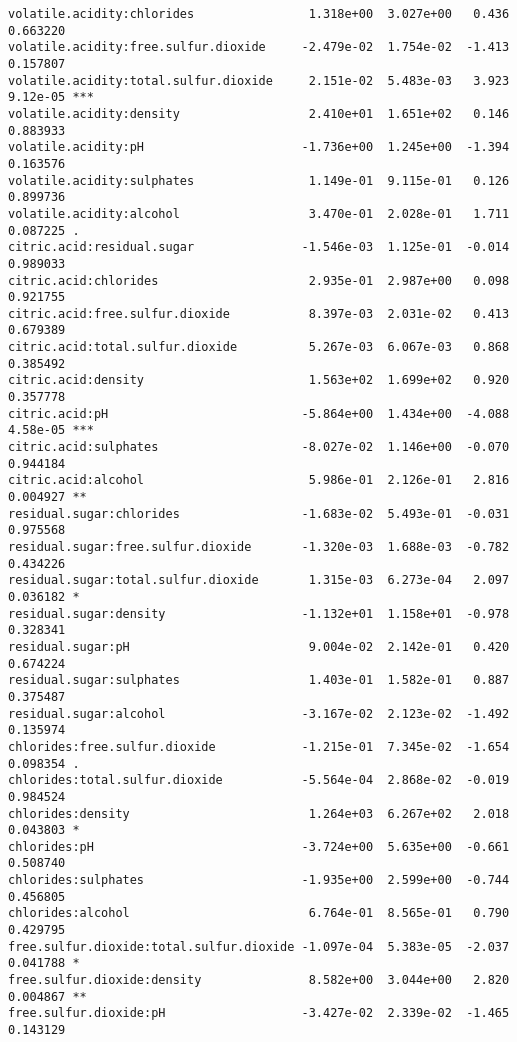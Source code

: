 \documentclass{jsarticle}
\begin{document}
\begin{verbatim}
volatile.acidity:chlorides                1.318e+00  3.027e+00   0.436 0.663220    
volatile.acidity:free.sulfur.dioxide     -2.479e-02  1.754e-02  -1.413 0.157807    
volatile.acidity:total.sulfur.dioxide     2.151e-02  5.483e-03   3.923 9.12e-05 ***
volatile.acidity:density                  2.410e+01  1.651e+02   0.146 0.883933    
volatile.acidity:pH                      -1.736e+00  1.245e+00  -1.394 0.163576    
volatile.acidity:sulphates                1.149e-01  9.115e-01   0.126 0.899736    
volatile.acidity:alcohol                  3.470e-01  2.028e-01   1.711 0.087225 .  
citric.acid:residual.sugar               -1.546e-03  1.125e-01  -0.014 0.989033    
citric.acid:chlorides                     2.935e-01  2.987e+00   0.098 0.921755    
citric.acid:free.sulfur.dioxide           8.397e-03  2.031e-02   0.413 0.679389    
citric.acid:total.sulfur.dioxide          5.267e-03  6.067e-03   0.868 0.385492    
citric.acid:density                       1.563e+02  1.699e+02   0.920 0.357778    
citric.acid:pH                           -5.864e+00  1.434e+00  -4.088 4.58e-05 ***
citric.acid:sulphates                    -8.027e-02  1.146e+00  -0.070 0.944184    
citric.acid:alcohol                       5.986e-01  2.126e-01   2.816 0.004927 ** 
residual.sugar:chlorides                 -1.683e-02  5.493e-01  -0.031 0.975568    
residual.sugar:free.sulfur.dioxide       -1.320e-03  1.688e-03  -0.782 0.434226    
residual.sugar:total.sulfur.dioxide       1.315e-03  6.273e-04   2.097 0.036182 *  
residual.sugar:density                   -1.132e+01  1.158e+01  -0.978 0.328341    
residual.sugar:pH                         9.004e-02  2.142e-01   0.420 0.674224    
residual.sugar:sulphates                  1.403e-01  1.582e-01   0.887 0.375487    
residual.sugar:alcohol                   -3.167e-02  2.123e-02  -1.492 0.135974    
chlorides:free.sulfur.dioxide            -1.215e-01  7.345e-02  -1.654 0.098354 .  
chlorides:total.sulfur.dioxide           -5.564e-04  2.868e-02  -0.019 0.984524    
chlorides:density                         1.264e+03  6.267e+02   2.018 0.043803 *  
chlorides:pH                             -3.724e+00  5.635e+00  -0.661 0.508740    
chlorides:sulphates                      -1.935e+00  2.599e+00  -0.744 0.456805    
chlorides:alcohol                         6.764e-01  8.565e-01   0.790 0.429795    
free.sulfur.dioxide:total.sulfur.dioxide -1.097e-04  5.383e-05  -2.037 0.041788 *  
free.sulfur.dioxide:density               8.582e+00  3.044e+00   2.820 0.004867 ** 
free.sulfur.dioxide:pH                   -3.427e-02  2.339e-02  -1.465 0.143129    

\end{verbatim}
\end{document}
